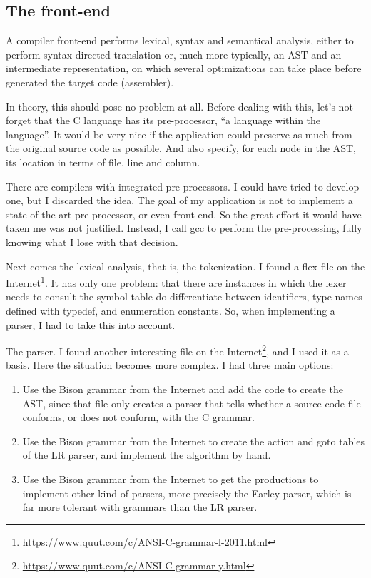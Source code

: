 \documentclass[a4paper,openany]{article}
\begin{document}
\subsection{The front-end}
A compiler front-end performs lexical, syntax and semantical analysis, either to perform syntax-directed translation or, much more typically, an AST and an intermediate representation, on which several optimizations can take place before generated the target code (assembler).

In theory, this should pose no problem at all. Before dealing with this, let's not forget that the C language has its pre-processor, ``a language within the language''. It would be very nice if the application could preserve as much from the original source code as possible. And also specify, for each node in the AST, its location in terms of file, line and column.

There are compilers with integrated pre-processors. I could have tried to develop one, but I discarded the idea. The goal of my application is not to implement a state-of-the-art pre-processor, or even front-end. So the great effort it would have taken me was not justified. Instead, I call gcc to perform the pre-processing, fully knowing what I lose with that decision.

Next comes the lexical analysis, that is, the tokenization. I found a flex file on the Internet\footnote{\url{https://www.quut.com/c/ANSI-C-grammar-l-2011.html}}. It has only one problem: that there are instances in which the lexer needs to consult the symbol table do differentiate between identifiers, type names defined with typedef, and enumeration constants. So, when implementing a parser, I had to take this into account.

The parser. I found another interesting file on the Internet\footnote{\url{https://www.quut.com/c/ANSI-C-grammar-y.html}}, and I used it as a basis. Here the situation becomes more complex. I had three main options:

\begin{enumerate}
\item Use the Bison grammar from the Internet and add the code to create the AST, since that file only creates a parser that tells whether a source code file conforms, or does not conform, with the C grammar.

\item Use the Bison grammar from the Internet to create the action and goto tables of the LR parser, and implement the algorithm by hand.

\item Use the Bison grammar from the Internet to get the productions to implement other kind of parsers, more precisely the Earley parser, which is far more tolerant with grammars than the LR parser.
\end{enumerate}
\end{document}
